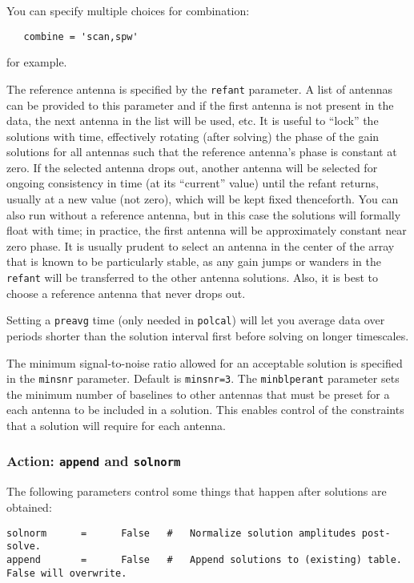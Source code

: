 You can specify multiple choices for combination:
\small
\begin{verbatim}
   combine = 'scan,spw'
\end{verbatim} 
\normalsize
for example.

The reference antenna is specified by the {\tt refant} parameter. A
list of antennas can be provided to this parameter and if the first
antenna is not present in the data, the next antenna in the list will
be used, etc.  It is useful to ``lock'' the solutions with time,
effectively rotating (after solving) the phase of the gain solutions
for all antennas such that the reference antenna's phase is constant
at zero.  If the selected antenna drops out, another antenna will be
selected for ongoing consistency in time (at its ``current'' value)
until the refant returns, usually at a new value (not zero), which
will be kept fixed thenceforth.  You can also run without a reference
antenna, but in this case the solutions will formally float with time;
in practice, the first antenna will be approximately constant near
zero phase.  It is usually prudent to select an antenna in the center
of the array that is known to be particularly stable, as any gain
jumps or wanders in the {\tt refant} will be transferred to the other
antenna solutions.  Also, it is best to choose a reference antenna
that never drops out.



Setting a {\tt preavg} time (only needed in {\tt polcal}) will let you
average data over periods shorter than the solution interval first
before solving on longer timescales.

The minimum signal-to-noise ratio allowed for an acceptable solution
is specified in the {\tt minsnr} parameter.  Default is {\tt minsnr=3}.
The {\tt minblperant} parameter sets the minimum number of baselines
to other antennas that must be preset for a each antenna to be
included in a solution.  This enables control of the constraints
that a solution will require for each antenna.

\subsubsection{Action: {\tt append} and {\tt solnorm} }
\label{section:cal.solve.pars.action}

The following parameters control some things that happen after
solutions are obtained:
\small
\begin{verbatim}
solnorm      =      False   #   Normalize solution amplitudes post-solve.
append       =      False   #   Append solutions to (existing) table.  False will overwrite.
\end{verbatim} 
\normalsize

